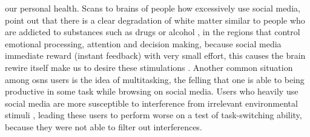 our personal health. Scans to brains of people how excessively use social media, point out that there is a clear degradation of white matter similar to people who are addicted to substances such as drugs or alcohol \citep{lin2012abnormal}, in the regions that control emotional processing, attention and decision making, because social media immediate reward (instant feedback) with very small effort, this causes the brain rewire itself make us to desire these stimulations \citep{berridge1998role}. Another common situation among \glspl{osn} users is the idea of multitasking, the felling that one is able to being productive in some task while browsing on social media. Users who heavily use social media are more susceptible to interference from irrelevant environmental stimuli \citep{ophir2009cognitive}, leading these users to perform worse on a test of task-switching ability, because they were not able to filter out interferences.
